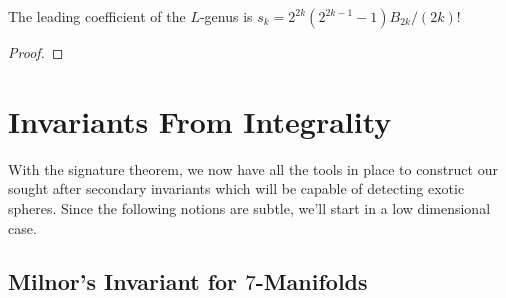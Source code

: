
\begin{proposition}\label{prop:leading_coefficient_L_genus}
	The leading coefficient of the $L$-genus is $s_k=2^{2k}(2^{2k-1}-1)B_{2k}/(2k)!$
\end{proposition}
\begin{proof}
\end{proof}


\section{Invariants From Integrality}\label{sec:invariants_from_integrability}

With the signature theorem, we now have all the tools in place to construct our sought after secondary invariants which will be capable of detecting exotic spheres. Since the following notions are subtle, we'll start in a low dimensional case.

\subsection*{Milnor's Invariant for $7$-Manifolds}

